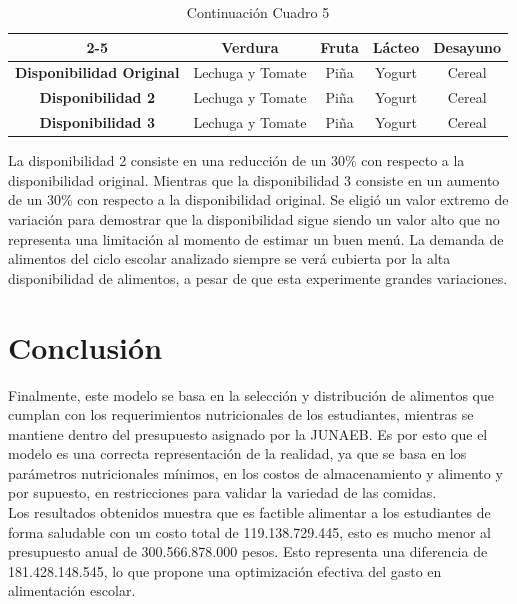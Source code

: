 \documentclass[letterpaper]{article}
\begin{document}
\begin{table}[H]
\centering
\begin{tabular}{c|c|c|c|c|}
\cline{2-5}
 & \textbf{Verdura} & \textbf{Fruta} & \textbf{Lácteo} & \textbf{Desayuno} \\ \hline
\multicolumn{1}{|c|}{\textbf{Disponibilidad Original}} & Lechuga y Tomate & Piña & Yogurt & Cereal \\ \hline
\multicolumn{1}{|c|}{\textbf{Disponibilidad 2}} & Lechuga y Tomate & Piña & Yogurt & Cereal \\ \hline
\multicolumn{1}{|c|}{\textbf{Disponibilidad 3}} & Lechuga y Tomate & Piña & Yogurt & Cereal \\ \hline
\end{tabular}
\caption{Continuación Cuadro 5}
\end{table}

La disponibilidad 2 consiste en una reducción de un 30\% con respecto a la disponibilidad original. Mientras que la disponibilidad 3 consiste en un aumento de un 30\% con respecto a la disponibilidad original. Se eligió un valor extremo de variación para demostrar que la disponibilidad sigue siendo un valor alto que no representa una limitación al momento de estimar un buen menú. La demanda de alimentos del ciclo escolar analizado siempre se verá cubierta por la alta disponibilidad de alimentos, a pesar de que esta experimente grandes variaciones.
 \\

\section{Conclusión}
Finalmente, este modelo se basa en la selección y distribución de alimentos que cumplan con los requerimientos nutricionales de los estudiantes, mientras se mantiene dentro del presupuesto asignado por la JUNAEB. Es por esto que el modelo es una correcta representación de la realidad, ya que se basa en los parámetros nutricionales mínimos, en los costos de almacenamiento y alimento y por supuesto, en restricciones para validar la variedad de las comidas. \\

Los resultados obtenidos muestra que es factible alimentar a los estudiantes de forma saludable con un costo total de 119.138.729.445, esto es mucho menor al presupuesto anual de 300.566.878.000 pesos. Esto representa una diferencia de 181.428.148.545, lo que propone una optimización efectiva del gasto en alimentación escolar. \\
\end{document}
